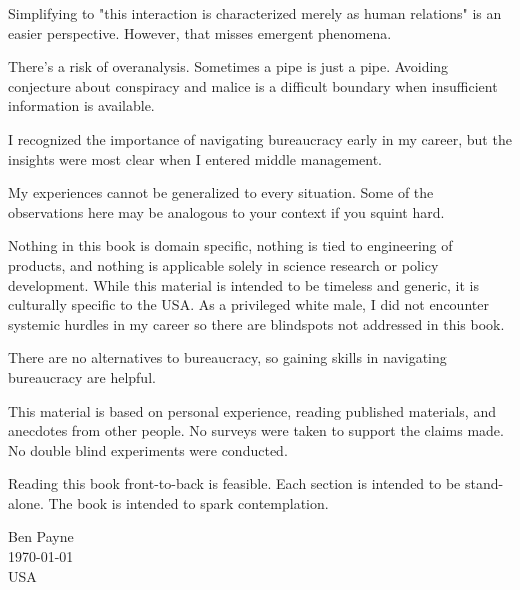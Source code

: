 Simplifying to "this interaction is characterized merely as human relations" is an easier perspective. However, that misses emergent phenomena. 

There's a risk of overanalysis. Sometimes a pipe is just a pipe. Avoiding conjecture about conspiracy and malice is a difficult boundary when insufficient information is available. 

I recognized the importance of navigating bureaucracy early in my career, but the insights were most clear when I entered middle management. 

My experiences cannot be generalized to every situation. Some of the observations here may be analogous to your context if you squint hard. 

Nothing in this book is domain specific, nothing is tied to engineering of products, and nothing is applicable solely in science research or policy development. While this material is intended to be timeless and generic, it is culturally specific to the USA. As a privileged white male, I did not encounter systemic hurdles in my career so there are blindspots not addressed in this book. 

There are no alternatives to bureaucracy, so gaining skills in navigating bureaucracy are helpful. 

This material is based on personal experience, reading published materials, and anecdotes from other people. No surveys were taken to support the claims made. No double blind experiments were conducted. 

Reading this book front-to-back is feasible. Each section is intended to be stand-alone. The book is intended to spark contemplation. 


\begin{flushright}
Ben Payne\\
\today\\
USA
\end{flushright}


